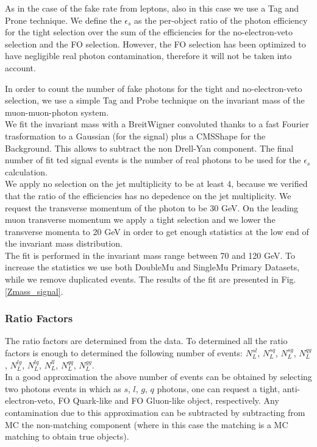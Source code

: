 As in the case of the fake rate from leptons, also in this case we use a Tag and Prone technique. We define the $\epsilon_{s}$ as the per-object ratio of the photon efficiency for the tight selection over the sum of the 
efficiencies  for 
the no-electron-veto selection and the FO selection. However, the FO selection has been optimized to have negligible real photon contamination, therefore it will not be taken into account.

In order to count the number of fake photons for the tight and no-electron-veto selection, we use a simple Tag and Probe technique on the invariant mass of the muon-muon-photon system. \\

We fit the invariant mass with a BreitWigner convoluted thanks to a fast Fourier trasformation to a Gaussian (for the signal) plus a CMSShape for the Background. This allows to subtract the non Drell-Yan component. The final 
number of fit
ted signal events is the number of real photons to be used for the  $\epsilon_{s}$ calculation.\\

We apply no selection on the jet multiplicity to be at least 4, because we verified that the ratio of the efficiencies has no depedence on the jet multiplicity. We request the transverse momentum of the photon to be 30 GeV. On the 
leading
 muon transverse momentum we apply a tight selection and we lower the transverse momenta to 20 GeV in order to get enough statistics at the low end of the invariant mass distribution. \\

The fit is performed in the invariant mass range between 70 and 120 GeV. To increase the statistics we use both DoubleMu and SingleMu Primary Datasets, while we remove duplicated events.  The results of the fit are presented in 
Fig. \ref{Zmass_signal}.


\subsubsection{Ratio Factors}

The ratio factors are determined from the data. To determined all the ratio factors is enough to determined the following number of events: $N^{sl}_{L}$, $N^{sq}_{L}$, $N^{sg}_{L}$, $N^{qg}_{L}$, $N^{lg}_{L}$, $N^{lq}_{L}$, 
$N^{ll}_{L}$, 
$N^{qq}_{L}$, $N^{gg}_{L}$. \\

In a good approximation the above number of events can be obtained by selecting two photons events in which as $s$, $l$, $g$, $q$ photons, one can request a tight, anti-electron-veto, FO Quark-like and FO Gluon-like object, 
respectively. 
Any contamination due to this approximation can be subtracted by subtracting from MC the non-matching component (where in this case the matching is a MC matching to obtain true objects). \\

